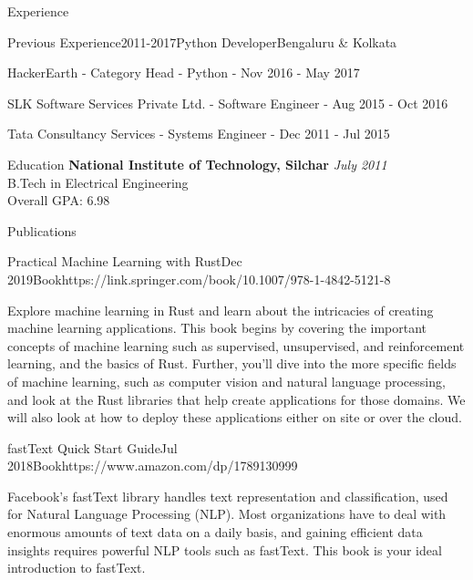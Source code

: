 \documentclass{resume}
\begin{document}
\begin{rSection}{Experience}
    \begin{rSubsection}{Previous Experience}{2011-2017}{Python Developer}{Bengaluru \& Kolkata}
    \item HackerEarth - Category Head - Python - Nov 2016 - May 2017
    \item SLK Software Services Private Ltd. - Software Engineer - Aug 2015 - Oct 2016
    \item Tata Consultancy Services - Systems Engineer - Dec 2011 - Jul 2015
    \end{rSubsection}
  
  \end{rSection}
  
  \begin{rSection}{Education}
    {\bf National Institute of Technology, Silchar} \hfill {\em July 2011} \\ 
    { B.Tech in Electrical Engineering } \\
    Overall GPA: 6.98
  \end{rSection}
  
  \begin{rSection}{Publications}

    \begin{rSubsection}{Practical Machine Learning with Rust}{Dec 2019}{Book}{https://link.springer.com/book/10.1007/978-1-4842-5121-8}
    \item Explore machine learning in Rust and learn about the intricacies of creating machine learning applications. This book begins by covering the important concepts of machine learning such as supervised, unsupervised, and reinforcement learning, and the basics of Rust. Further, you’ll dive into the more specific fields of machine learning, such as computer vision and natural language processing, and look at the Rust libraries that help create applications for those domains. We will also look at how to deploy these applications either on site or over the cloud.
    \end{rSubsection}
    
    \begin{rSubsection}{fastText Quick Start Guide}{Jul 2018}{Book}{https://www.amazon.com/dp/1789130999}
    \item Facebook's fastText library handles text representation and classification, used for Natural Language Processing (NLP). Most organizations have to deal with enormous amounts of text data on a daily basis, and gaining efficient data insights requires powerful NLP tools such as fastText. This book is your ideal introduction to fastText.
    \end{rSubsection}
    
  \end{rSection}
  
\end{document}
